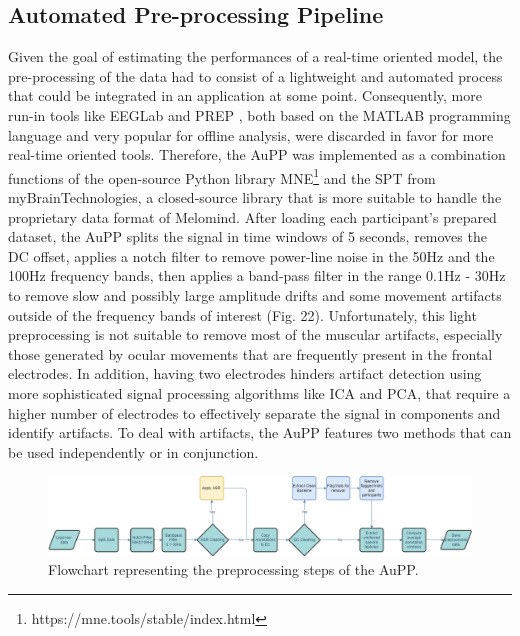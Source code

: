 \subsection{Automated Pre-processing Pipeline}
\label{sec:automated_pipeline}
Given the goal of estimating the performances of a real-time oriented model, the pre-processing of the data had to consist of a lightweight and automated process that could be integrated in an application at some point. Consequently, more run-in tools like EEGLab and PREP \cite{bigdely-shamlo_prep_2015}, both based on the MATLAB programming language and very popular for offline analysis, were discarded in favor for more real-time oriented tools. Therefore, the \ac{AuPP} was implemented as a combination functions of the open-source Python library MNE\footnote{https://mne.tools/stable/index.html}  and the \ac{SPT} from myBrainTechnologies, a closed-source library that is more suitable to handle the proprietary data format of Melomind. After loading each participant’s prepared dataset, the \ac{AuPP} splits the signal in time windows of 5 seconds, removes the DC offset, applies a notch filter to remove power-line noise in the 50Hz and the 100Hz frequency bands, then applies a band-pass filter in the range 0.1Hz - 30Hz to remove slow and possibly large amplitude drifts and some movement artifacts outside of the frequency bands of interest (Fig. 22). Unfortunately, this light preprocessing is not suitable to remove most of the muscular artifacts, especially those generated by ocular movements that are frequently present in the frontal electrodes. In addition, having two electrodes hinders artifact detection using more sophisticated signal processing algorithms like \ac{ICA} and \ac{PCA}, that require a higher number of electrodes to effectively separate the signal in components and identify artifacts. To deal with artifacts, the \ac{AuPP} features two methods that can be used independently or in conjunction.

\begin{figure}[h!]
\includegraphics[width=15cm]{img/methods/preprocessing_pipeline.png}
\centering
\caption{Flowchart representing the preprocessing steps of the AuPP.} \label{fig_prep_pipeline}
\end{figure}

